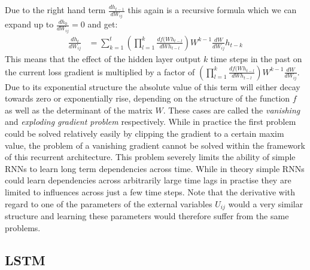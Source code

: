 Due to the right hand term $\frac{dh_{t-1}}{dW_{ij}}$ this again is a recursive formula which we can expand up to $ \frac{dh_{0}}{dW_{ij}} = 0$ and get:
\begin{align*}
\frac{dh_t}{dW_{ij}} &= \sum_{k = 1}^t( \prod_{l = 1}^k \frac{df(Wh_{t-l}}{dWh_{t-l}}) W^{k-1} \frac{dW}{dW_{ij}} h_{t-k}
\end{align*}
This means that the effect of the hidden layer output $k$ time steps in the past on the current loss gradient is multiplied by a factor of $(\prod_{l = 1}^k \frac{df(Wh_{t-l}}{dWh_{t-l}}) W^{k-1}\frac{dW}{dW_{ij}}$. Due to its exponential structure the absolute value of this term  will either decay towards zero or exponentially rise, depending on the structure of the function $f$ as well as the determinant of the matrix $W$. These cases are called the \textit{vanishing} and \textit{exploding gradient problem} respectively. While in practice the first problem could be solved relatively easily by clipping the gradient to a certain maxim value, the problem of a vanishing gradient cannot be solved within the framework of this recurrent architecture. This problem severely limits the ability of simple RNNs to learn long term dependencies across time. While in theory simple RNNs could learn dependencies across arbitrarily large time lags in practise they are limited to influences across just a few time steps. Note that the derivative with regard to one of the parameters of the external variables $U_{ij}$ would a very similar structure and learning these parameters would therefore suffer from the same problems.


\subsection{LSTM}


